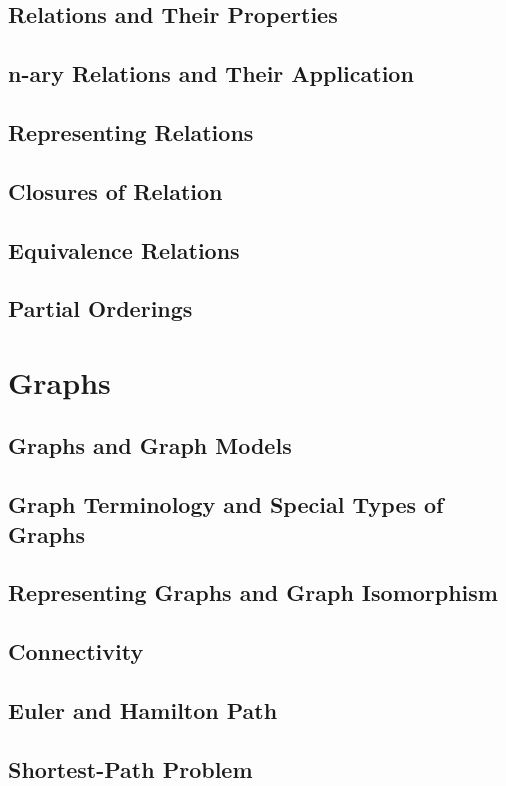 \documentclass{article}
\begin{document}
\subsection{Relations and Their Properties}
\subsection{n-ary Relations and Their Application}
\subsection{Representing Relations}
\subsection{Closures of Relation}
\subsection{Equivalence Relations}
\subsection{Partial Orderings}

\section{Graphs}

\subsection{Graphs and Graph Models}
\subsection{Graph Terminology and Special Types of Graphs}
\subsection{Representing Graphs and Graph Isomorphism}
\subsection{Connectivity}
\subsection{Euler and Hamilton Path}
\subsection{Shortest-Path Problem}
\end{document}
